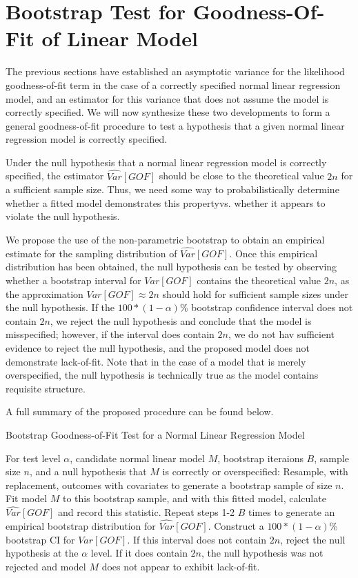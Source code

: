 		\section{Bootstrap Test for Goodness-Of-Fit of Linear Model} \label{sec:boot_test}

		The previous sections have established an asymptotic variance for the likelihood goodness-of-fit term in the case of a correctly specified normal linear regression model, and an
		estimator for this variance that does not assume the model is correctly specified. We will now synthesize these two developments to form a general goodness-of-fit procedure to
		test a hypothesis that a given normal linear regression model is correctly specified.

		Under the null hypothesis that a normal linear regression model is correctly specified, the estimator $\widehat{Var}[GOF]$ should be close to the theoretical value $2n$ for a
		sufficient sample size. Thus, we need some way to probabilistically determine whether a fitted model demonstrates this propertyvs. whether it appears to violate the null
		hypothesis.
		
		We propose the use of the non-parametric bootstrap to obtain an empirical estimate for the sampling distribution of $\widehat{Var}[GOF]$. Once this empirical distribution
		has been obtained, the null hypothesis can be tested by observing whether a bootstrap interval for $Var[GOF]$ contains the theoretical value $2n$, as the approximation
		$Var[GOF] \approx 2n$ should hold for sufficient sample sizes under the null hypothesis. If the $100*(1-\alpha)$\% bootstrap confidence interval does not contain 
		$2n$, we reject the null hypothesis and conclude that the model is misspecified; however, if the interval does contain $2n$, we do not hav sufficient evidence to reject
		the null hypothesis, and the proposed model does not demonstrate lack-of-fit. Note that in the case of a model that is merely overspecified, the null hypothesis is technically
		true as the model contains requisite structure.

		A full summary of the proposed procedure can be found below.
		\begin{algorithm}
			\caption{Bootstrap Goodness-of-Fit Test for a Normal Linear Regression Model}
			\begin{algorithmic}[1]
			  \Statex For test level $\alpha$, candidate normal linear model $M$, bootstrap iteraions $B$, sample size $n$, and a null hypothesis that $M$
			  is correctly or overspecified:
			  \State Resample, with replacement, outcomes with covariates to generate a bootstrap sample of size $n$.
			  \State Fit model $M$ to this bootstrap sample, and with this fitted model, calculate $\widehat{Var}[GOF]$
			  and record this statistic.
			  \State Repeat steps 1-2 $B$ times to generate an empirical bootstrap distribution for $\widehat{Var}[GOF]$.
			  \State Construct a $100*(1-\alpha)$\% bootstrap CI for $Var[GOF]$.
			  \State If this interval does not contain $2n$, reject the null hypothesis at the $\alpha$ level. If it does contain
			  $2n$, the null hypothesis was not rejected and model $M$ does not appear to exhibit lack-of-fit. 
			\end{algorithmic}
		\end{algorithm}

